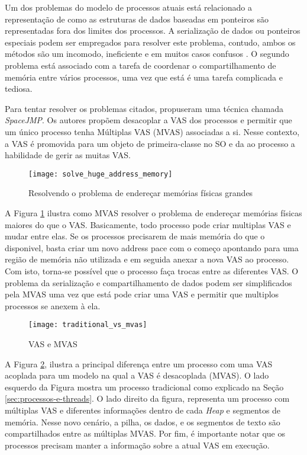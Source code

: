 Um dos problemas do modelo de processos atuais está relacionado a representação
de como as estruturas de dados baseadas em ponteiros são representadas fora dos
limites dos processos. A serialização de dados ou ponteiros especiais podem ser
empregados para resolver este problema, contudo, ambos os métodos são um
incomodo, ineficiente e em muitos casos confusos \citep{spacejmp}. O segundo
problema está associado com a tarefa de coordenar o compartilhamento de memória
entre vários processos, uma vez que está é uma tarefa complicada e tediosa.

Para tentar resolver os problemas citados, \cite{spacejmp} propuseram uma
técnica chamada \emph{SpaceJMP}. Os autores propõem desacoplar a VAS dos
processos e permitir que um único processo tenha Múltiplas VAS (MVAS)
associadas a si. Nesse contexto, a VAS é promovida para um objeto de
primeira-classe no SO e da ao processo a habilidade de gerir as muitas
VAS.

\begin{figure}[!h]
  \centering
  \texttt{[image: solve\_huge\_address\_memory]}
  \caption{Resolvendo o problema de endereçar memórias físicas grandes}
  \label{fig:large_memory}
\end{figure}

A Figura \ref{fig:large_memory} ilustra como MVAS resolver o problema de
endereçar memórias físicas maiores do que o VAS. Basicamente, todo processo
pode criar multiplas VAS e mudar entre elas. Se os processos precisarem de mais
memória do que o disponivel, basta criar um novo address pace com o começo
apontando para uma região de memória não utilizada e em seguida anexar a nova
VAS ao processo. Com isto, torna-se possível que o processo faça trocas entre
as diferentes VAS. O problema da serialização e compartilhamento de dados podem
ser simplificados pela MVAS uma vez que está pode criar uma VAS e permitir que
multiplos processos se anexem à ela.

\begin{figure}[!h]
  \centering
  \texttt{[image: traditional\_vs\_mvas]} 
  \caption{VAS e MVAS \citep{spacejmp}}
  \label{fig:traditional_vs_mvas} 
\end{figure}

A Figura \ref{fig:traditional_vs_mvas}, ilustra a principal diferença entre um
processo com uma VAS acoplada para um modelo na qual a VAS é desacoplada
(MVAS). O lado esquerdo da Figura mostra um processo tradicional como explicado
na Seção \ref{sec:processos-e-threads}. O lado direito da figura, representa um
processo com múltiplas VAS e diferentes informações dentro de cada \emph{Heap}
e segmentos de memória. Nesse novo cenário, a pilha, os dados, e os segmentos
de texto são compartilhados entre as múltiplas MVAS. Por fim, é importante
notar que os processos precisam manter a informação sobre a atual VAS em
execução.
 
